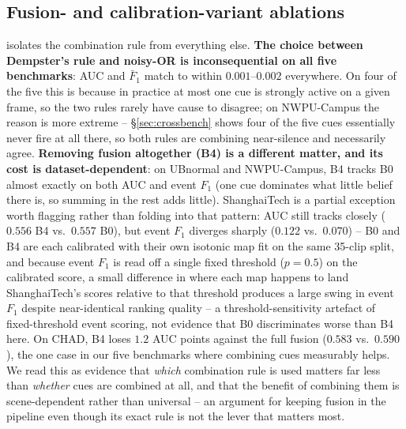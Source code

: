 \documentclass[conference]{IEEEtran}
\begin{document}
\subsection{Fusion- and calibration-variant ablations}
\label{sec:ablations}


 isolates the combination rule from everything
else. \textbf{The choice between Dempster's rule and noisy-OR is
inconsequential on all five benchmarks}: AUC and $\bar F_1$ match to within
$0.001$--$0.002$ everywhere. On four of the five this is because in practice
at most one cue is strongly active on a given frame, so the two rules rarely
have cause to disagree; on NWPU-Campus the reason is more extreme --
\S\ref{sec:crossbench} shows four of the five cues essentially never fire at
all there, so both rules are combining near-silence and necessarily agree.
\textbf{Removing fusion altogether (B4) is a different matter, and its cost
is dataset-dependent}: on UBnormal and NWPU-Campus, B4 tracks B0 almost
exactly on both AUC and event $F_1$ (one cue dominates what little belief
there is, so summing in the rest adds little). ShanghaiTech is a partial
exception worth flagging rather than folding into that pattern: AUC still
tracks closely ($0.556$ B4 vs.\ $0.557$ B0), but event $F_1$ diverges sharply
($0.122$ vs.\ $0.070$) -- B0 and B4 are each calibrated with their own
isotonic map fit on the same 35-clip split, and because event $F_1$ is read
off a single fixed threshold ($p=0.5$) on the calibrated score, a small
difference in where each map happens to land ShanghaiTech's scores relative
to that threshold produces a large swing in event $F_1$ despite near-identical
ranking quality -- a threshold-sensitivity artefact of fixed-threshold event
scoring, not evidence that B0 discriminates worse than B4 here. On CHAD, B4
loses $1.2$ AUC points against the full fusion ($0.583$ vs.\ $0.590$), the
one case in our five benchmarks where combining cues measurably helps. We
read this as evidence that
\emph{which} combination rule is used matters far less than \emph{whether}
cues are combined at all, and that the benefit of combining them is
scene-dependent rather than universal -- an argument for keeping fusion
in the pipeline even though its exact rule is not the lever that matters
most.
\end{document}
